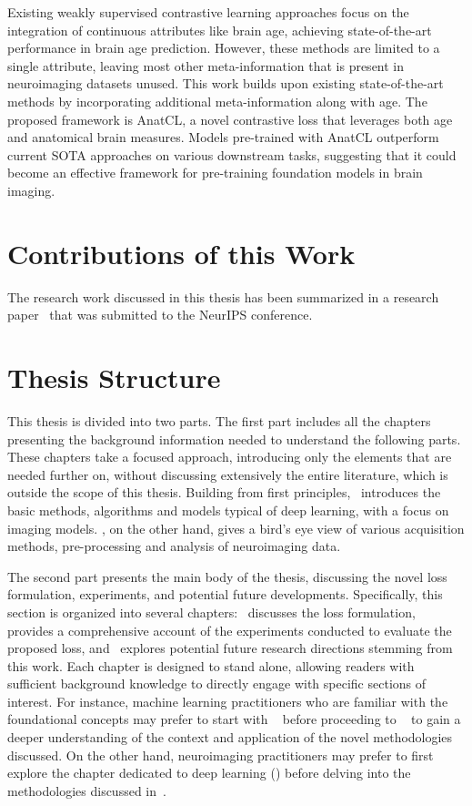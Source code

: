 Existing weakly supervised contrastive learning approaches focus on the
integration of continuous attributes like brain age, achieving state-of-the-art
performance in brain age prediction. However, these methods are limited to a
single attribute, leaving most other meta-information that is present in
neuroimaging datasets unused. This work builds upon existing state-of-the-art
methods by incorporating additional meta-information along with age. The
proposed framework is AnatCL, a novel contrastive loss that leverages both age
and anatomical brain measures. Models pre-trained with AnatCL outperform current
SOTA approaches on various downstream tasks, suggesting that it could become an
effective framework for pre-training foundation models in brain imaging. 

\section{Contributions of this Work}
The research work discussed in this thesis has been summarized in a research
paper~ that was submitted to the NeurIPS
conference.

\section{Thesis Structure}
This thesis is divided into two parts. The first part includes all the chapters
presenting the background information needed to understand the following parts.
These chapters take a focused approach, introducing only the elements that are
needed further on, without discussing extensively the entire literature, which
is outside the scope of this thesis. Building from first
principles,~ introduces the basic methods, algorithms and
models typical of deep learning, with a focus on imaging models.
, on the other hand, gives a bird's eye view of various
acquisition methods, pre-processing and analysis of neuroimaging data.

The second part presents the main body of the thesis, discussing the novel loss
formulation, experiments, and potential future developments. Specifically, this
section is organized into several chapters:~ discusses the loss
formulation,~ provides a comprehensive account of the
experiments conducted to evaluate the proposed loss, and~ explores potential future research
directions stemming from this work. Each chapter is designed to stand alone,
allowing readers with sufficient background knowledge to directly engage with
specific sections of interest. For instance, machine learning practitioners who
are familiar with the foundational concepts may prefer to start with
~ before proceeding to ~ to gain a deeper
understanding of the context and application of the novel methodologies
discussed. On the other hand, neuroimaging practitioners may prefer to first
explore the chapter dedicated to deep learning () before
delving into the methodologies discussed in~.
